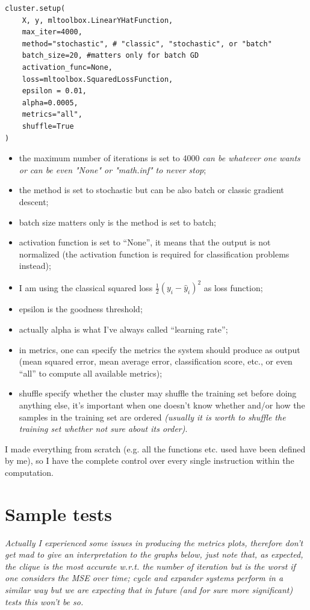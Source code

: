 \documentclass[a4paper,12pt]{article}
\theoremstyle{newplanestyle}
\theoremstyle{newdefinitionstyle}
\theoremstyle{newprovestyle}
\begin{document}
\begin{lstlisting}
cluster.setup(
    X, y, mltoolbox.LinearYHatFunction,
    max_iter=4000,
    method="stochastic", # "classic", "stochastic", or "batch"
    batch_size=20, #matters only for batch GD
    activation_func=None,
    loss=mltoolbox.SquaredLossFunction,
    epsilon = 0.01,
    alpha=0.0005,
    metrics="all",
    shuffle=True
)
\end{lstlisting}

\begin{itemize}
\item the maximum number of iterations is set to 4000 \textit{can be whatever one wants or can be even "None" or "math.inf" to never stop};
\item the method is set to stochastic but can be also batch or classic gradient descent;
\item batch size matters only is the method is set to batch;
\item activation function is set to ``None'', it means that the output is not normalized (the activation function is required for classification problems instead);
\item I am using the classical squared loss $\frac{1}{2}(y_i - \hat{y}_i)^2$ as loss function;
\item epsilon is the goodness threshold;
\item actually alpha is what I've always called ``learning rate'';
\item in metrics, one can specify the metrics the system should produce as output (mean squared error, mean average error, classification score, etc., or even ``all'' to compute all available metrics);
\item shuffle specify whether the cluster may shuffle the training set before doing anything else, it's important when one doesn't know whether and/or how the samples in the training set are ordered \textit{(usually it is worth to shuffle the training set whether not sure about its order)}.
\end{itemize}


I made everything from scratch (e.g. all the functions etc. used have been defined by me), so I have the complete control over every single instruction within the computation.

\section*{Sample tests}
\textit{Actually I experienced some issues in producing the metrics plots, therefore don't get mad to give an interpretation to the graphs below, just note that, as expected, the clique is the most accurate w.r.t. the number of iteration but is the worst if one considers the MSE over time; cycle and expander systems perform in a similar way but we are expecting that in future (and for sure more significant) tests this won't be so.}
\end{document}

